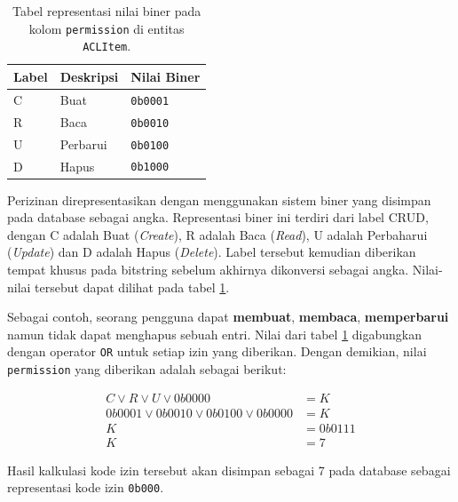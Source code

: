     \begin{table}[H]
        \centering
        \begin{tabular}{|l|l|l|}
        \hline
        Label & Deskripsi & Nilai Biner \\ \hline
        C     & Buat      & \texttt{0b0001}        \\ \hline
        R     & Baca      & \texttt{0b0010}        \\ \hline
        U     & Perbarui  & \texttt{0b0100}        \\ \hline
        D     & Hapus     & \texttt{0b1000}        \\ \hline
        \end{tabular}
        \caption{Tabel representasi nilai biner pada kolom \texttt{permission}
        di entitas \texttt{ACLItem}.}
        \label{tab:aclitem_level}
    \end{table}
        
    
    Perizinan direpresentasikan dengan menggunakan sistem biner yang disimpan
    pada database sebagai angka. Representasi biner ini terdiri dari label CRUD,
    dengan C adalah Buat (\textit{Create}), R adalah Baca (\textit{Read}), U
    adalah Perbaharui (\textit{Update}) dan D adalah Hapus (\textit{Delete}).
    Label tersebut kemudian diberikan tempat khusus pada bitstring sebelum
    akhirnya dikonversi sebagai angka. Nilai-nilai tersebut dapat dilihat pada
    tabel \ref{tab:aclitem_level}.
    
    
    Sebagai contoh, seorang pengguna dapat \textbf{membuat}, \textbf{membaca},
    \textbf{memperbarui} namun tidak dapat menghapus sebuah entri. Nilai dari
    tabel \ref{tab:aclitem_level} digabungkan dengan operator \texttt{OR} untuk
    setiap izin yang diberikan. Dengan demikian, nilai \texttt{permission} yang
    diberikan adalah sebagai berikut:
    
    \begin{subequations}
        \begin{align}
            C \vee R \vee U \vee 0b0000 &= K\\
            0b0001 \vee 0b0010 \vee 0b0100 \vee 0b0000 &= K \\
            K &= 0b0111 \\
            K &= 7
        \end{align}
    \end{subequations}
    
    Hasil kalkulasi kode izin tersebut akan disimpan sebagai 7 pada database
    sebagai representasi kode izin \texttt{0b000}. 
    
